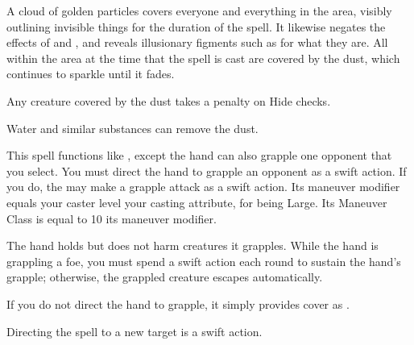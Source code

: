 \spellrng{\rngmed}
\spelldur{\durshort}
\begin{spelleffect}
  A cloud of golden particles covers everyone and everything in the area, visibly outlining invisible things for the duration of the spell. It likewise negates the effects of  and , and reveals illusionary figments such as  for what they are. All within the area at the time that the spell is cast are covered by the dust, which continues to sparkle until it fades.
  \par Any creature covered by the dust takes a  penalty on Hide checks.
\end{spelleffect}
\begin{spelleffect}
  Water and similar substances can remove the dust.
\end{spelleffect}

\begin{spelleffect}
  This spell functions like , except the hand can also grapple one opponent that you select. You must direct the hand to grapple an opponent as a swift action. If you do, the  may make a grapple attack as a swift action. Its maneuver modifier equals your caster level \add your casting attribute,  for being Large. Its Maneuver Class is equal to 10 \add its maneuver modifier.
  \par The hand holds but does not harm creatures it grapples. While the hand is grappling a foe, you must spend a swift action each round to sustain the hand's grapple; otherwise, the grappled creature escapes automatically.
  \par If you do not direct the hand to grapple, it simply provides cover as .
\end{spelleffect}
\begin{spellnotes}
  Directing the spell to a new target is a swift action.
\end{spellnotes}

